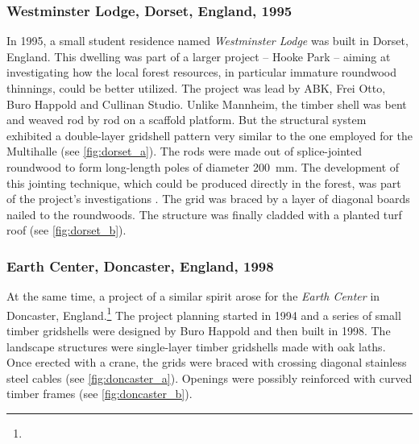 \subsubsection{Westminster Lodge, Dorset, England, 1995}
In 1995, a small student residence named \emph{Westminster Lodge} was built in Dorset, England. This dwelling was part of a larger project -- Hooke Park -- aiming at investigating how the local forest resources, in particular immature roundwood  thinnings, could be better utilized. The project was lead by ABK, Frei Otto, Buro Happold and Cullinan Studio. Unlike Mannheim, the timber shell was bent and weaved rod by rod on a scaffold platform. But the structural system exhibited a double-layer gridshell pattern very similar to the one employed for the Multihalle (see \cref{fig:dorset_a}). The rods were made out of splice-jointed roundwood to form long-length poles of diameter \SI{200}{mm}. The development of this jointing technique, which could be produced directly in the forest, was part of the project's investigations \cite{Burton1998}. The grid was braced by a layer of diagonal boards nailed to the roundwoods. The structure was finally cladded with a planted turf roof (see \cref{fig:dorset_b}).


\subsubsection{Earth Center, Doncaster, England, 1998}
At the same time, a project of a similar spirit arose for the \emph{Earth Center} in Doncaster, England.\footnote{} The project planning started in 1994 and a series of small timber gridshells were designed by Buro Happold and then built in 1998. The landscape structures were single-layer timber gridshells made with oak laths. Once erected with a crane, the grids were braced with crossing diagonal stainless steel cables (see \cref{fig:doncaster_a}). Openings were possibly reinforced with curved timber frames (see \cref{fig:doncaster_b}).

